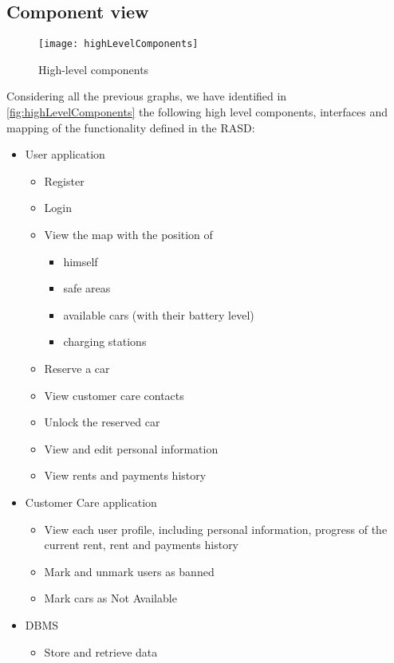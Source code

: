 \clearpage

\subsection{Component view}
\begin{figure}[h]
	\centering
	\texttt{[image: highLevelComponents]}
	\caption{
		\label{fig:highLevelComponents} 
		High-level components
	}
\end{figure}
Considering all the previous graphs, we have identified in \autoref{fig:highLevelComponents} the following high level components, interfaces and mapping of the functionality defined in the RASD:
\begin{itemize}

	\item User application
	\begin{itemize}
		\item Register
		\item Login
		\item View the map with the position of
		\begin{itemize}
			\item himself
			\item safe areas
			\item available cars (with their battery level)
			\item charging stations
		\end{itemize}
		\item Reserve a car
		\item View customer care contacts
		\item Unlock the reserved car
		\item View and edit personal information
		\item View rents and payments history
	\end{itemize}
	
	\item Customer Care application
	\begin{itemize}
		\item View each user profile, including personal information, progress of the current rent, rent and payments history
		\item Mark and unmark users as banned
		\item Mark cars as Not Available
	\end{itemize}
	
	\item DBMS
	\begin{itemize}
		\item Store and retrieve data
	\end{itemize}	
	

\end{itemize}
